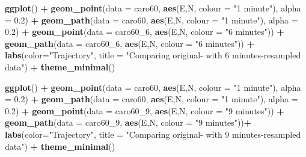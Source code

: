 \documentclass[]{book}
\newenvironment{Shaded}{\begin{snugshade}}{\end{snugshade}}
\newcommand{\KeywordTok}[1]{\textcolor[rgb]{0.13,0.29,0.53}{\textbf{#1}}}
\newcommand{\DataTypeTok}[1]{\textcolor[rgb]{0.13,0.29,0.53}{#1}}
\newcommand{\DecValTok}[1]{\textcolor[rgb]{0.00,0.00,0.81}{#1}}
\newcommand{\FloatTok}[1]{\textcolor[rgb]{0.00,0.00,0.81}{#1}}
\newcommand{\StringTok}[1]{\textcolor[rgb]{0.31,0.60,0.02}{#1}}
\newcommand{\OperatorTok}[1]{\textcolor[rgb]{0.81,0.36,0.00}{\textbf{#1}}}
\newcommand{\NormalTok}[1]{#1}
\begin{document}
\begin{Shaded}
\begin{Highlighting}[]
{{{{{{{{\KeywordTok{ggplot}\NormalTok{() }\OperatorTok{+}
\StringTok{  }\KeywordTok{geom_point}\NormalTok{(}\DataTypeTok{data =}\NormalTok{ caro60, }\KeywordTok{aes}\NormalTok{(E,N, }\DataTypeTok{colour =} \StringTok{"1 minute"}\NormalTok{), }\DataTypeTok{alpha =} \FloatTok{0.2}\NormalTok{) }\OperatorTok{+}
\StringTok{  }\KeywordTok{geom_path}\NormalTok{(}\DataTypeTok{data =}\NormalTok{ caro60, }\KeywordTok{aes}\NormalTok{(E,N, }\DataTypeTok{colour =} \StringTok{"1 minute"}\NormalTok{), }\DataTypeTok{alpha =} \FloatTok{0.2}\NormalTok{) }\OperatorTok{+}
\StringTok{  }\KeywordTok{geom_point}\NormalTok{(}\DataTypeTok{data =}\NormalTok{ caro60_}\DecValTok{6}\NormalTok{, }\KeywordTok{aes}\NormalTok{(E,N, }\DataTypeTok{colour =} \StringTok{"6 minutes"}\NormalTok{)) }\OperatorTok{+}
\StringTok{  }\KeywordTok{geom_path}\NormalTok{(}\DataTypeTok{data =}\NormalTok{ caro60_}\DecValTok{6}\NormalTok{, }\KeywordTok{aes}\NormalTok{(E,N, }\DataTypeTok{colour =} \StringTok{"6 minutes"}\NormalTok{)) }\OperatorTok{+}
\StringTok{  }\KeywordTok{labs}\NormalTok{(}\DataTypeTok{color=}\StringTok{"Trajectory"}\NormalTok{, }\DataTypeTok{title =} \StringTok{"Comparing original- with 6 minutes-resampled data"}\NormalTok{) }\OperatorTok{+}
\StringTok{  }\KeywordTok{theme_minimal}\NormalTok{()}

\KeywordTok{ggplot}\NormalTok{() }\OperatorTok{+}
\StringTok{  }\KeywordTok{geom_point}\NormalTok{(}\DataTypeTok{data =}\NormalTok{ caro60, }\KeywordTok{aes}\NormalTok{(E,N, }\DataTypeTok{colour =} \StringTok{"1 minute"}\NormalTok{), }\DataTypeTok{alpha =} \FloatTok{0.2}\NormalTok{) }\OperatorTok{+}
\StringTok{  }\KeywordTok{geom_path}\NormalTok{(}\DataTypeTok{data =}\NormalTok{ caro60, }\KeywordTok{aes}\NormalTok{(E,N, }\DataTypeTok{colour =} \StringTok{"1 minute"}\NormalTok{), }\DataTypeTok{alpha =} \FloatTok{0.2}\NormalTok{) }\OperatorTok{+}
\StringTok{  }\KeywordTok{geom_point}\NormalTok{(}\DataTypeTok{data =}\NormalTok{ caro60_}\DecValTok{9}\NormalTok{, }\KeywordTok{aes}\NormalTok{(E,N, }\DataTypeTok{colour =} \StringTok{"9 minutes"}\NormalTok{)) }\OperatorTok{+}
\StringTok{  }\KeywordTok{geom_path}\NormalTok{(}\DataTypeTok{data =}\NormalTok{ caro60_}\DecValTok{9}\NormalTok{, }\KeywordTok{aes}\NormalTok{(E,N, }\DataTypeTok{colour =} \StringTok{"9 minutes"}\NormalTok{))}\OperatorTok{+}
\StringTok{  }\KeywordTok{labs}\NormalTok{(}\DataTypeTok{color=}\StringTok{"Trajectory"}\NormalTok{, }\DataTypeTok{title =} \StringTok{"Comparing original- with 9 minutes-resampled data"}\NormalTok{) }\OperatorTok{+}
\StringTok{  }\KeywordTok{theme_minimal}\NormalTok{()}


}}}}}}}}
\end{Highlighting}
\end{Shaded}
\end{document}
